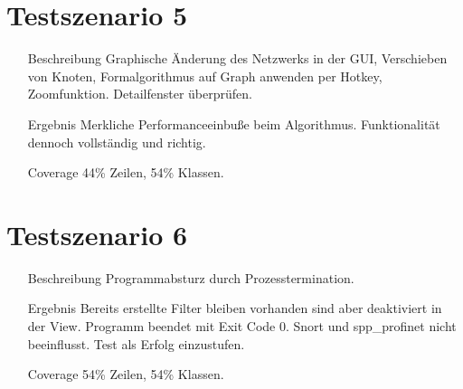 \section{Testszenario 5}

\begin{enumerate}[leftmargin = *, align=parleft, labelsep=3cm]
  \item[Beschreibung] Graphische Änderung des Netzwerks in der GUI, Verschieben von Knoten, Formalgorithmus auf Graph anwenden per Hotkey, Zoomfunktion. Detailfenster überprüfen.
  \item[Ergebnis] Merkliche Performanceeinbuße beim Algorithmus. Funktionalität dennoch vollständig und richtig.
  \item[Coverage] 44\% Zeilen, 54\% Klassen.
\end{enumerate}

\section{Testszenario 6}

\begin{enumerate}[leftmargin = *, align=parleft, labelsep=3cm]
  \item[Beschreibung] Programmabsturz durch Prozesstermination.
  \item[Ergebnis] Bereits erstellte Filter bleiben vorhanden sind aber deaktiviert in der View. Programm beendet mit Exit Code 0. Snort und spp\_profinet nicht beeinflusst. Test als Erfolg einzustufen.
  \item[Coverage] 54\% Zeilen, 54\% Klassen.
\end{enumerate}